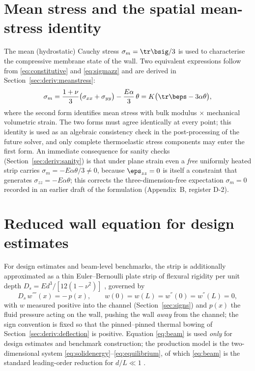 \section{Mean stress and the spatial mean-stress identity}
\label{sec:meanstress}
The mean (hydrostatic) Cauchy stress $\sigma_m=\tr\bsig/3$ is used to characterise the compressive
membrane state of the wall. Two equivalent expressions follow from \eqref{eq:constitutive} and
\eqref{eq:sigmazz} and are derived in Section~\ref{sec:deriv:meanstress}:
\begin{equation}
\sigma_m=\frac{1+\nu}{3}\big(\sigma_{xx}+\sigma_{yy}\big)-\frac{E\alpha}{3}\,\theta
=K\big(\tr\beps-3\alpha\theta\big),
\label{eq:meanstress}
\end{equation}
where the second form identifies mean stress with bulk modulus $\times$ mechanical volumetric
strain. The two forms must agree identically at every point; this identity is used as an algebraic
consistency check in the post-processing of the future solver, and only complete thermoelastic
stress components may enter the first form. An immediate consequence for sanity checks
(Section~\ref{sec:deriv:sanity}) is that under plane strain even a \emph{free} uniformly heated
strip carries $\sigma_m=-E\alpha\theta/3\neq0$, because $\eps_{zz}=0$ is itself a constraint that
generates $\sigma_{zz}=-E\alpha\theta$; this corrects the three-dimension-free expectation
$\sigma_m=0$ recorded in an earlier draft of the formulation (Appendix~B, register D-2).

\section{Reduced wall equation for design estimates}
\label{sec:beam}
For design estimates and beam-level benchmarks, the strip is additionally approximated as a thin
Euler--Bernoulli plate strip of flexural rigidity per unit depth
$D_s=Ed^3/[12(1-\nu^2)]$ \cite{timoshenko1970elasticity}, governed by
\begin{equation}
D_s\,w^{''''}(x)= -\,p(x), \qquad
w(0)=w(L)=w^{''}(0)=w^{''}(L)=0,
\label{eq:beam}
\end{equation}
with $w$ measured positive into the channel (Section~\ref{sec:signs}) and $p(x)$ the fluid pressure
acting on the wall, pushing the wall \emph{away} from the channel; the sign convention is fixed so
that the pinned--pinned thermal bowing of Section~\ref{sec:deriv:deflection} is positive.
Equation \eqref{eq:beam} is used \emph{only} for design estimates and benchmark construction; the
production model is the two-dimensional system \eqref{eq:solidenergy}--\eqref{eq:equilibrium}, of
which \eqref{eq:beam} is the standard leading-order reduction for $d/L\ll1$
\cite{timoshenko1970elasticity}.

